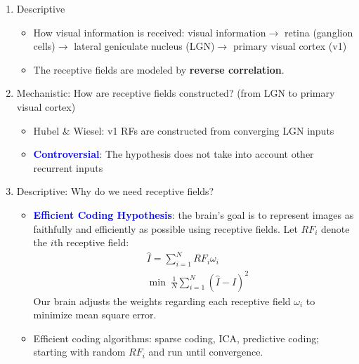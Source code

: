 \documentclass[11pt]{article}
\begin{document}
\begin{enumerate}
    \item Descriptive
    \begin{itemize}
        \item How visual information is received: visual information$\rightarrow$ retina (ganglion cells)$\rightarrow$ lateral geniculate nucleus (LGN)$\rightarrow$ primary visual cortex (v1)
        \begin{center}
        \end{center}
        \item The receptive fields are modeled by \textbf{reverse correlation}.
    \end{itemize}
    \item Mechanistic: How are receptive fields constructed? (from LGN to primary visual cortex)
    \begin{itemize}
        \item Hubel \& Wiesel: v1 RFs are constructed from converging LGN inputs
        \item \textcolor{Blue}{\textbf{Controversial}}: The hypothesis does not take into account other recurrent inputs
    \end{itemize}
    \item Descriptive: Why do we need receptive fields?
    \begin{itemize}
        \item \textcolor{Blue}{\textbf{Efficient Coding Hypothesis}}: the brain's goal is to represent images as faithfully and efficiently as possible using receptive fields. Let $RF_i$ denote the $i$th receptive field:
        \begin{align*}
            &\hat{I} = \sum_{i=1}^N RF_i\omega_i\\
            &\min \ \frac{1}{N}\sum_{i=1}^N (\hat{I}-I)^2
        \end{align*}
        Our brain adjusts the weights regarding each receptive field $\omega_i$ to minimize mean square error.
        \item Efficient coding algorithms: sparse coding, ICA, predictive coding; starting with random $RF_i$ and run until convergence.
    \end{itemize}
\end{enumerate}
\end{document}
